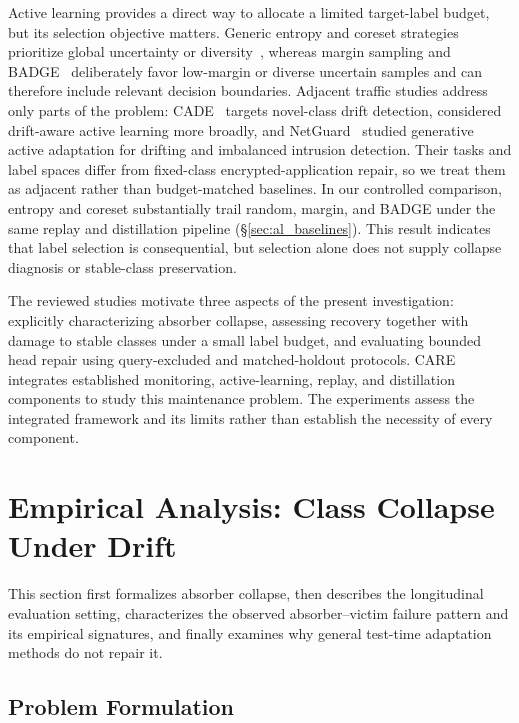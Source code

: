 \documentclass[preprint,12pt,authoryear]{elsarticle}
\let\cite\citep
\begin{document}
Active learning provides a direct way to allocate a limited target-label budget, but its selection objective matters. Generic entropy and coreset strategies prioritize global uncertainty or diversity~\cite{settles2009active,sener2018coreset}, whereas margin sampling and BADGE~\cite{ash2020badge} deliberately favor low-margin or diverse uncertain samples and can therefore include relevant decision boundaries. Adjacent traffic studies address only parts of the problem: CADE~\cite{yang2021cade} targets novel-class drift detection, \citet{micfoal2023} considered drift-aware active learning more broadly, and NetGuard~\cite{netguard2025} studied generative active adaptation for drifting and imbalanced intrusion detection. Their tasks and label spaces differ from fixed-class encrypted-application repair, so we treat them as adjacent rather than budget-matched baselines. In our controlled comparison, entropy and coreset substantially trail random, margin, and BADGE under the same replay and distillation pipeline (\S\ref{sec:al_baselines}). This result indicates that label selection is consequential, but selection alone does not supply collapse diagnosis or stable-class preservation.

The reviewed studies motivate three aspects of the present investigation: explicitly characterizing absorber collapse, assessing recovery together with damage to stable classes under a small label budget, and evaluating bounded head repair using query-excluded and matched-holdout protocols. CARE integrates established monitoring, active-learning, replay, and distillation components to study this maintenance problem. The experiments assess the integrated framework and its limits rather than establish the necessity of every component.


\section{Empirical Analysis: Class Collapse Under Drift}
\label{sec:analysis}

This section first formalizes absorber collapse, then describes the longitudinal evaluation setting, characterizes the observed absorber--victim failure pattern and its empirical signatures, and finally examines why general test-time adaptation methods do not repair it.

\subsection{Problem Formulation}
\label{sec:problem}
\end{document}
